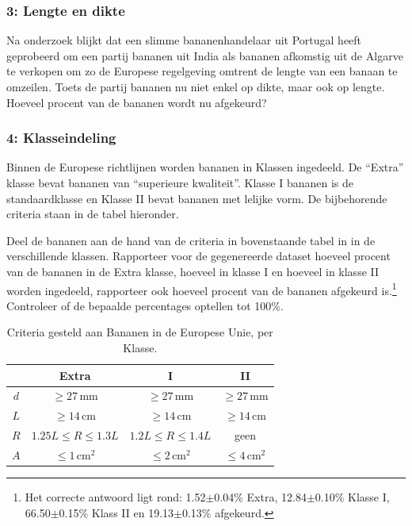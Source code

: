 \documentclass[a4paper,11pt, fleqn]{article}
\begin{document}
\subsubsection*{3: Lengte en dikte}
Na onderzoek blijkt dat een slimme bananenhandelaar uit Portugal heeft geprobeerd om een partij bananen uit India als bananen afkomstig uit de Algarve te verkopen om zo de Europese regelgeving omtrent de lengte van een banaan te omzeilen. Toets de partij bananen nu niet enkel op dikte, maar ook op lengte. Hoeveel procent van de bananen wordt nu afgekeurd?

\subsubsection*{4: Klasseindeling}
Binnen de Europese richtlijnen worden bananen in Klassen ingedeeld. De ``Extra'' klasse bevat bananen van ``superieure kwaliteit''. Klasse I bananen is de standaardklasse en Klasse II bevat bananen met lelijke vorm. De bijbehorende criteria staan in de tabel hieronder.

Deel de bananen aan de hand van de criteria in bovenstaande tabel in in de verschillende klassen. Rapporteer voor de gegenereerde dataset hoeveel procent van de bananen in de Extra klasse, hoeveel in klasse I en hoeveel in klasse II worden ingedeeld, rapporteer ook hoeveel procent van de bananen afgekeurd is.\footnote{Het correcte antwoord ligt rond: 1.52$\pm$0.04\% Extra, 12.84$\pm$0.10\% Klasse I, 66.50$\pm$0.15\% Klass II en 19.13$\pm$0.13\% afgekeurd.} Controleer of de bepaalde percentages optellen tot 100\%.

\begin{table}[!ht]
	\centering
	\caption{Criteria gesteld aan Bananen in de Europese Unie, per Klasse.}
	\begin{tabular}{c c c c}
		&\textbf{Extra} & \textbf{I} & \textbf{II}\\
		\hline
		$d$ & $\geq 27\,\textrm{mm}$     &$\geq 27\,\textrm{mm}$    &$\geq 27\,\textrm{mm}$\\
		$L$ & $\geq 14\,\textrm{cm}$     &$\geq 14\,\textrm{cm}$    &$\geq 14\,\textrm{cm}$\\
		$R$ & $1.25 L \leq R \leq 1.3 L$ &$1.2 L \leq R \leq 1.4 L$ & geen\\
		$A$ & $\leq 1\,\textrm{cm}^2$    &$\leq 2\,\textrm{cm}^2$   & $\leq 4\,\textrm{cm}^2$\\
		\hline
	\end{tabular}
\end{table}
\end{document}
